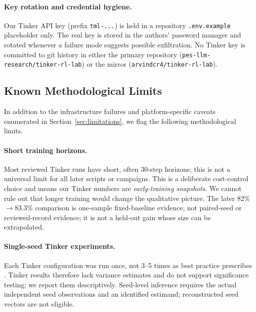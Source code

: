 \paragraph{Key rotation and credential hygiene.}
Our Tinker API key (prefix \texttt{tml-...}) is held in a repository
\texttt{.env.example} placeholder only. The real key is stored in the
authors' password manager and rotated whenever a failure mode suggests
possible exfiltration. No Tinker key is committed to git history in
either the primary repository (\texttt{pes-llm-research/tinker-rl-lab}) or
the mirror (\texttt{arvindcr4/tinker-rl-lab}).

\subsection{Known Methodological Limits}
\label{sec:methodlimits}

In addition to the infrastructure failures and platform-specific caveats
enumerated in Section~\ref{sec:limitations}, we flag the following
methodological limits.

\paragraph{Short training horizons.}
Most reviewed Tinker runs have short, often 30-step horizons; this is not
a universal limit for all later scripts or campaigns. This is a
deliberate cost-control choice and means our Tinker numbers are
\emph{early-training snapshots}. We cannot rule out that longer training
would change the qualitative picture. The later 82\%$\to$83.3\% comparison
is one-sample fixed-baseline evidence, not paired-seed or reviewed-record
evidence; it is not a held-out gain whose size can be extrapolated.

\paragraph{Single-seed Tinker experiments.}
Each Tinker configuration was run once, not 3--5 times as best practice
prescribes \cite{henderson2018deep}. Tinker results therefore lack
variance estimates and do not support significance testing; we report
them descriptively. Seed-level inference requires the actual independent seed observations and
an identified estimand; reconstructed seed vectors are not eligible.


